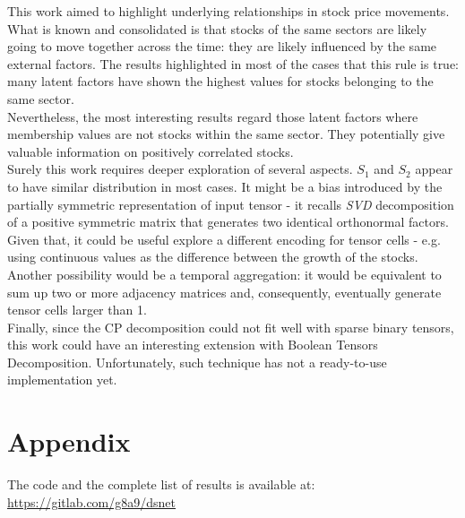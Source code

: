 \documentclass[12pt]{extarticle}
\begin{document}
This work aimed to highlight underlying relationships in stock price movements. What is known and consolidated is that stocks of the same sectors are likely going to move together across the time: they are likely influenced by the same external factors. The results highlighted in most of the cases that this rule is true: many latent factors have shown the highest values for stocks belonging to the same sector.\\
Nevertheless, the most interesting results regard those latent factors where membership values are not stocks within the same sector. They potentially give valuable information on positively correlated stocks.\\
Surely this work requires deeper exploration of several aspects. $S_1$ and $S_2$ appear to have similar distribution in most cases. It might be a bias introduced by the partially symmetric representation of input tensor - it recalls \textit{SVD} decomposition of a positive symmetric matrix that generates two identical orthonormal factors. Given that, it could be useful explore a different encoding for tensor cells - e.g. using continuous values as the difference between the growth of the stocks. Another possibility would be a temporal aggregation: it would be equivalent to sum up two or more adjacency matrices and, consequently, eventually generate tensor cells larger than 1.\\
Finally, since the CP decomposition could not fit well with sparse binary tensors, this work could have an interesting extension with Boolean Tensors Decomposition. Unfortunately, such technique has not a ready-to-use implementation yet.

\section{Appendix}

The code and the complete list of results is available at:\\ \href{https://gitlab.com/g8a9/dsnet}{https://gitlab.com/g8a9/dsnet}



\end{document}
